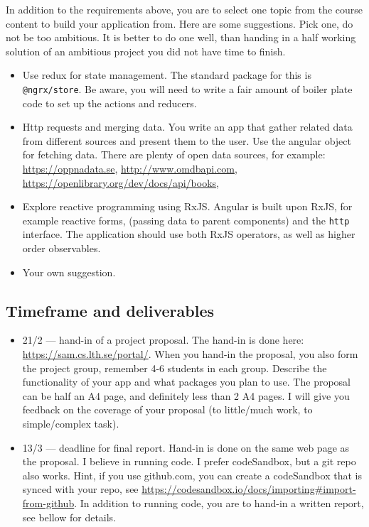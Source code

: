 \documentclass[fleqn, article, a4paper]{memoir}
\begin{document}
\noindent In addition to the requirements above, you are to select one topic from the course content to build your application from. Here are some suggestions. Pick one, do not be too ambitious. It is better to do one well, than handing in a half working solution of an ambitious project you did not have time to finish.
\begin{itemize}
\item Use redux for state management. The standard package for this is \texttt{@ngrx/store}. Be aware, you will need to write a fair amount of boiler plate code to set up the actions and reducers.
\item Http requests and merging data. You write an app that gather related data from different sources and present them to the user. Use the angular  object for fetching data. There are plenty of open data sources, for example: \url{https://oppnadata.se}, \url{http://www.omdbapi.com}, \url{https://openlibrary.org/dev/docs/api/books}, 
\item Explore reactive programming using RxJS. Angular is built upon RxJS, for example reactive forms,  (passing data to parent components) and the \texttt{http} interface. The application should use both RxJS operators, as well as higher order observables.
\item Your own suggestion. 
\end{itemize}

\subsection*{Timeframe and deliverables}

\begin{itemize}
\item 21/2 --- hand-in of a project proposal. The hand-in is done here: \url{https://sam.cs.lth.se/portal/}. When you hand-in the proposal, you also form the project group, remember 4-6 students in each group. Describe the functionality of your app and what packages you plan to use. The proposal can be half an A4 page, and definitely less than 2 A4 pages. I will give you feedback on the coverage of your proposal (to little/much work, to simple/complex task).
\item 13/3 --- deadline for final report. Hand-in is done on the same web page as the proposal. I believe in running code. I prefer codeSandbox, but a git repo also works. Hint, if you use github.com, you can create a codeSandbox that is synced with your repo, see \url{https://codesandbox.io/docs/importing#import-from-github}. In addition to running code, you are to hand-in a written report, see bellow for details.
\end{itemize}
\end{document}
